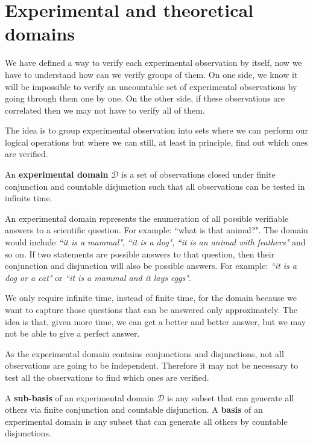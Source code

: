 \documentclass[11pt,letterpaper,fleqn]{memoir} %
\begin{document}
\section{Experimental and theoretical domains}

We have defined a way to verify each experimental observation by itself, now we have to understand how can we verify groups of them. On one side, we know it will be impossible to verify an uncountable set of experimental observations by going through them one by one. On the other side, if these observations are correlated then we may not have to verify all of them.

The idea is to group experimental observation into sets where we can perform our logical operations but where we can still, at least in principle, find out which ones are verified.

\begin{mathSection}
\begin{defn}
	An \textbf{experimental domain} $\mathcal{D}$ is a set of observations closed under finite conjunction and countable disjunction such that all observations can be tested in infinite time. 
\end{defn}
\end{mathSection}

An experimental domain represents the enumeration of all possible verifiable answers to a scientific question. For example: ``what is that animal?". The domain would include \emph{``it is a mammal"}, \emph{``it is a dog"}, \emph{``it is an animal with feathers"} and so on. If two statements are possible answers to that question, then their conjunction and disjunction will also be possible answers. For example: \emph{``it is a dog or a cat"} or \emph{``it is a mammal and it lays eggs"}.

We only require infinite time, instead of finite time, for the domain because we want to capture those questions that can be answered only approximately. The idea is that, given more time, we can get a better and better answer, but we may not be able to give a perfect answer.

As the experimental domain contains conjunctions and disjunctions, not all observations are going to be independent. Therefore it may not be necessary to test all the observations to find which ones are verified.

\begin{mathSection}
\begin{defn}
	A \textbf{sub-basis} of an experimental domain $\mathcal{D}$ is any subset that can generate all others via finite conjunction and countable disjunction. A \textbf{basis} of an experimental domain is any subset that can generate all others by countable disjunctions. 
\end{defn}
\end{mathSection}
\end{document}
